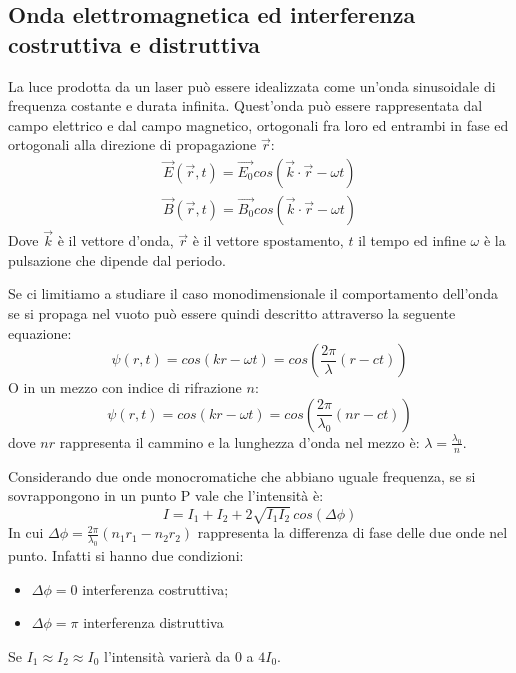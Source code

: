 \documentclass[11pt]{article}
\begin{document}
\subsection{Onda elettromagnetica ed interferenza costruttiva e distruttiva}
La luce prodotta da un laser può essere idealizzata come un'onda sinusoidale di frequenza costante e durata infinita. Quest'onda può essere rappresentata dal campo elettrico e dal campo magnetico, ortogonali fra loro ed entrambi in fase ed ortogonali alla direzione di propagazione $\Vec{r}$:
\begin{equation}\begin{split}
    \Vec{E}(\Vec{r}, t) = \Vec{E_0}cos(\Vec{k}\cdot \Vec{r}-\omega t) \\
    \Vec{B}(\Vec{r}, t) = \Vec{B_0}cos(\Vec{k}\cdot \Vec{r}-\omega t)
\end{split}\end{equation}
Dove $\Vec{k}$ è il vettore d'onda, $\Vec{r}$ è il vettore spostamento, $t$ il tempo ed infine $\omega$ è la pulsazione che dipende dal periodo.

Se ci limitiamo a studiare il caso monodimensionale il comportamento dell'onda se si propaga nel vuoto può essere quindi descritto attraverso la seguente equazione:
\begin{equation}
    \psi(r, t) = cos(kr-\omega t)=cos(\frac{2\pi}{\lambda}(r-ct))
\end{equation}
O in un mezzo con indice di rifrazione $n$:
\begin{equation}
    \psi(r, t) = cos(kr-\omega t)= cos(\frac{2\pi}{\lambda_0}(nr-ct))
\end{equation}
dove $nr$ rappresenta il cammino e la lunghezza d'onda nel mezzo è: $\lambda = \frac{\lambda_0}{n}$.

Considerando due onde monocromatiche che abbiano uguale frequenza, se si sovrappongono in un punto P vale che l'intensità è: 
\begin{equation}
    I = I_1 + I_2 +2\sqrt{I_1 I_2}\, cos(\Delta\phi)
\end{equation}
In cui $\Delta\phi = \frac{2\pi}{\lambda_0}(n_1r_1-n_2r_2)$ rappresenta la differenza di fase delle due onde nel punto. Infatti si hanno due condizioni:
\begin{itemize}
    \item $\Delta\phi = 0$ interferenza costruttiva;
    \item $\Delta\phi = \pi$ interferenza distruttiva
\end{itemize}
Se $I_1 \approx I_2 \approx I_0$ l'intensità varierà da $0$ a $4I_0$. 
\end{document}
